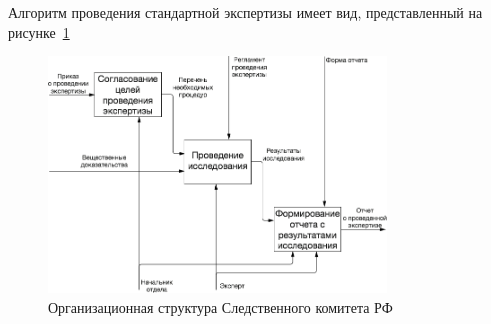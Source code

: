 Алгоритм проведения стандартной экспертизы имеет вид, представленный на рисунке~\ref{fig:research_order}

\begin{figure}[H]
	\centering
	\includegraphics[width=0.8\textwidth]{pics/research_order.png}
	\caption{Организационная структура Следственного комитета РФ}
	\label{fig:research_order}
\end{figure}

